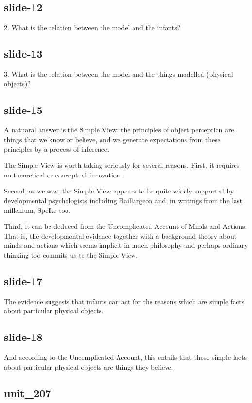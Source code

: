 \documentclass[12pt,\papersize]{extarticle}
\begin{document}
\subsection{slide-12}
2. What is the relation between the model and the infants?

\subsection{slide-13}
3. What is the relation between the model and the things modelled (physical objects)?

\subsection{slide-15}
A natuaral answer is the Simple View: the principles of object perception are things that we know or believe, and we generate expectations from these principles by a process of inference.

The Simple View is worth taking seriously for several reasons.
First, it requires no theoretical or conceptual innovation.

Second, as we saw, the Simple View appears to be quite widely supported by
developmental psychologists including Baillargeon and, in writings from the
last millenium, Spelke too.

Third, it can be deduced from the Uncomplicated Account of Minds and Actions.
That is, the developmental evidence together with
a background theory about minds and actions which seems implicit in
much philosophy and perhaps ordinary thinking too
commits us to the Simple View.

\subsection{slide-17}
The evidence suggests that infants can act for the reasons which are
simple facts about particular physical objects.

\subsection{slide-18}
And according to the Uncomplicated Account, this entails that those
simple facts about particular physical objects
are things they believe.

\subsection{unit\_207}
\end{document}
